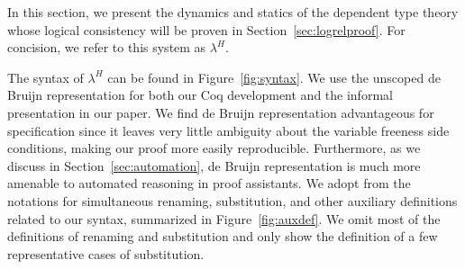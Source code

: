 \documentclass[acmsmall]{acmart}
\newcommand{\lang}{$\lambda^H$\xspace}
\begin{document}
In this section, we present the dynamics and statics of the
dependent type theory whose logical consistency will be proven in
Section~\ref{sec:logrelproof}. For concision, we refer to this system
as \lang.

The syntax of \lang can be found in Figure~\ref{fig:syntax}. We use
the unscoped de Bruijn representation for both our Coq development and
the informal presentation in our paper. We find de Bruijn
representation advantageous for specification since it leaves very
little ambiguity about the variable freeness side
conditions, making our proof more easily reproducible. Furthermore, as we discuss in
Section~\ref{sec:automation}, de Bruijn representation is much more
amenable to automated reasoning in proof assistants.
We adopt from \citet{autosubst} the notations for simultaneous
renaming, substitution, and other auxiliary definitions related to our
syntax, summarized in Figure~\ref{fig:auxdef}. We omit most of the
definitions of renaming and substitution and only show the definition
of a few representative cases of substitution.
\end{document}
